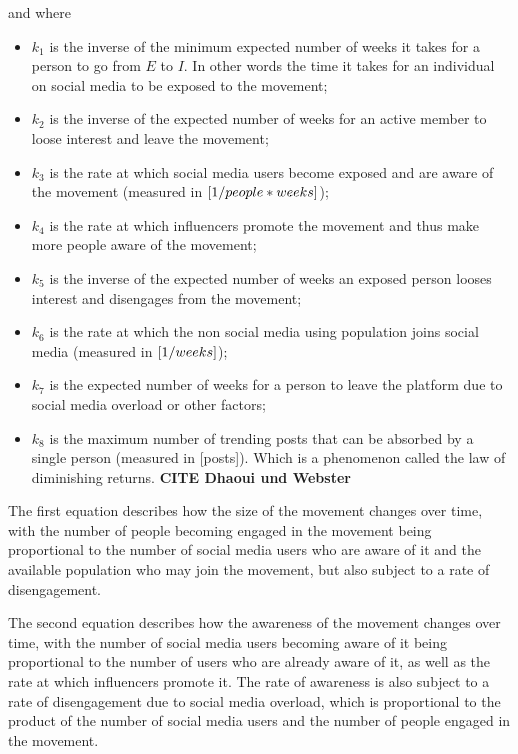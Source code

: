 \documentclass{article}
\begin{document}
    and where
    \begin{itemize}
        \item $k_1$ is the inverse of the minimum expected number of weeks it takes for a person to go from $E$ to $I$. In other words the time it takes for an individual on social media to be exposed to the movement;
        \item $k_2$ is the inverse of the expected number of weeks for an active member to loose interest and leave the movement;
        \item $k_3$ is the rate at which social media users become exposed and are aware of the movement (measured in $[\text1/{people*weeks}]$);
        \item $k_4$ is the rate at which influencers promote the movement and thus make more people aware of the movement; 
        \item $k_5$ is the inverse of the expected number of weeks an exposed person looses interest and disengages from the movement;
        \item $k_6$ is the rate at which the non social media using population joins social media (measured in $[\text1/{weeks}]$);
        \item $k_7$ is the expected number of weeks for a person to leave the platform due to social media overload or other factors; 
        \item $k_8$ is the maximum number of trending posts that can be absorbed by a single person (measured in [posts]). Which is a phenomenon called the law of diminishing returns. \textbf{CITE Dhaoui und Webster}
    \end{itemize}
    
    The first equation describes how the size of the movement changes over time, with the number of people becoming engaged in the movement being proportional to the number of social media users who are aware of it and the available population who may join the movement, but also subject to a rate of disengagement. 
    
	The second equation describes how the awareness of the movement changes over time, with the number of social media users becoming aware of it being proportional to the number of users who are already aware of it, as well as the rate at which influencers promote it. The rate of awareness is also subject to a rate of disengagement due to social media overload, which is proportional to the product of the number of social media users and the number of people engaged in the movement. 
 
\end{document}
